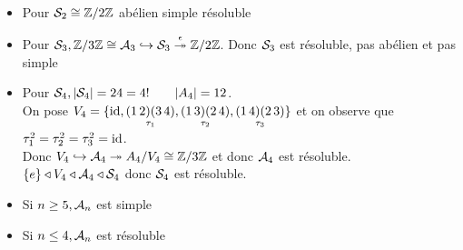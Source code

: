\documentclass[]{report}
\begin{document}
    \begin{ex}{}{}
        \begin{itemize}
            \item Pour $\mathcal{S}_2\cong \mathbb{Z}/2\mathbb{Z}$ abélien simple résoluble
            \item Pour $\mathcal{S}_3, \mathbb{Z}/3\mathbb{Z}\cong\mathcal{A}_3\hookrightarrow \mathcal{S}_3\overset{\epsilon}{\twoheadrightarrow}\mathbb{Z}/2\mathbb{Z}$. Donc $\mathcal{S}_3$ est résoluble, pas abélien et pas simple
            \item Pour $\mathcal{S}_4, |\mathcal{S}_4|=24=4!\qquad |A_4|=12$.\\
            On pose $V_4=\{\text{id},\underset{\tau_1}{(1\, 2)(3\,4)},\underset{\tau_2}{(1\,3)(2\,4)},\underset{\tau_3}{(1\,4)(2\,3)}\}$ et on observe que $\tau_1^2=\tau_2^2=\tau_3^2=\text{id}$.\\
            Donc $V_4\hookrightarrow\mathcal{A}_4\twoheadrightarrow A_4/V_4\cong \mathbb{Z}/3\mathbb{Z}$ et donc $\mathcal{A}_4$ est résoluble.\\
            $\{e\}\triangleleft V_4\triangleleft \mathcal{A}_4\triangleleft\mathcal{S}_4$ donc $\mathcal{S}_4$ est résoluble.
        \end{itemize}
    \end{ex}

    \begin{tm}{}{}
        \begin{itemize}
            \item Si $n\ge 5,\mathcal{A}_n$ est simple
            \item Si $n\le 4,\mathcal{A}_n$ est résoluble
        \end{itemize}
    \end{tm}
\end{document}
